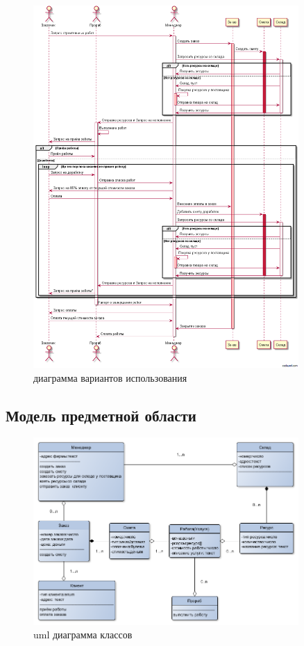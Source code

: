 \begin{figure}[!ht]
	\centering
	\includegraphics[width=0.9\textwidth]{img/getimage.png}
	\caption{диаграмма вариантов использования}
\end{figure}
\newpage
\subsection{Модель предметной области}
\begin{figure}[!ht]
	\centering
	\includegraphics[width=0.9\textwidth]{img/uml_class_diagram.png}
	\caption{uml диаграмма классов}
\end{figure}

